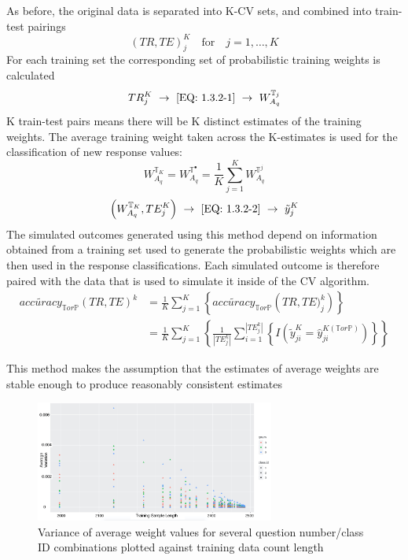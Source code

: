 \documentclass[12pt,]{article}
\begin{document}
As before, the original data is separated into K-CV sets, and combined
into train-test pairings
\[(TR, TE)_{j}^{K} \quad \text{for} \quad j=1, \ldots, K\] For each
training set the corresponding set of probabilistic training weights is
calculated
\[TR_{j}^{K} \ \rightarrow \ \eqref{EQ: 1.3.2-1} \ \rightarrow \  W_{A_{q}}^{\mathbb{T}_{j}}\]
K train-test pairs means there will be K distinct estimates of the
training weights. The average training weight taken across the
K-estimates is used for the classification of new response values:
\[W_{A_{q}}^{\mathbb{T}_{K}}= W_{A_{q}}^{\mathbb{T}^{\bullet}}=\frac{1}{K}\sum_{j=1}^{K} W_{A_{q}}^{\mathbb{T}^{j}}\]
\[\left(W_{A_{q}}^{\mathbb{T}_{K}}, TE_{j}^{K}\right)  \ \rightarrow \  \eqref{EQ: 1.3.2-2} \ \rightarrow \   \tilde{y}_{j}^{K}\]
The simulated outcomes generated using this method depend on information
obtained from a training set used to generate the probabilistic weights
which are then used in the response classifications. Each simulated
outcome is therefore paired with the data that is used to simulate it
inside of the CV algorithm. \begin{align*}
  \tilde{accuracy}_{\mathbb{T}or\mathbb{P}}\left(TR, TE \right)^{k} &= \frac{1}{K}\sum_{j=1}^{K} \left \{\tilde{accuracy}_{\mathbb{T}or\mathbb{P}} \left(TR, TE)_{j}^{k}   \right)   \right \} \\
  &= \frac{1}{K}\sum_{j=1}^{K} \left \{ \frac{1}{|TE_{j}^{k}|} \sum_{i=1}^{|TE_{j}^{k}|} \left \{ I\left(\tilde{y}_{ji}^{K}=\hat{y}_{ji}^{K\left(\mathbb{T}or\mathbb{P} \right) } \right) \right \}   \right \}
\end{align*}

This method makes the assumption that the estimates of average weights
are stable enough to produce reasonably consistent estimates

\begin{figure}[!h]
\begin{center}
\includegraphics[width=0.7\textwidth]{VariancePlot.jpg}
\end{center}
\caption[Probabilistic Simulation Weight Variances]{Variance of average weight values for several question number/class ID combinations plotted against training data count length}
\end{figure}
\end{document}
